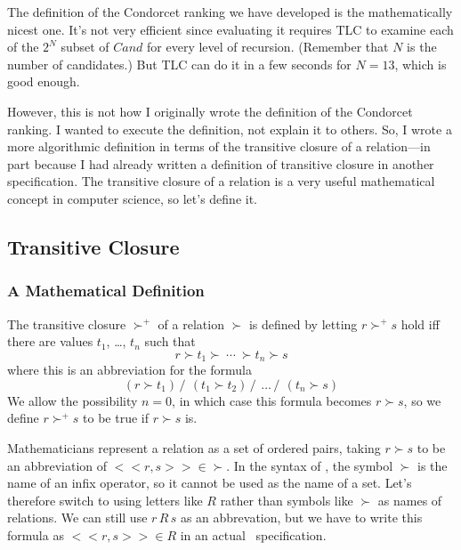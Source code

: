 \documentclass[fleqn,leqno]{article}
\begin{document}
\bigskip

The definition of the Condorcet ranking we have developed is the
mathematically nicest one.  It's not very efficient since evaluating
it requires TLC to examine each of the $2^{N}$ subset of $Cand$ for
every level of recursion.  (Remember that $N$ is the number of
candidates.)  But TLC can do it in a few seconds for $N=13$, which is
good enough.

However, this is not how I originally wrote the definition of the
Condorcet ranking.  I wanted to execute the definition, not explain it
to others.  So, I wrote a more algorithmic definition in terms of the
transitive closure of a relation---in part because I had already
written a definition of transitive closure in another specification.
The transitive closure of a relation is a very useful mathematical
concept in computer science, so let's define it.


\subsection[Transitive Closure]{Transitive 
Closure} 

\subsubsection{A Mathematical Definition}

The transitive closure $\succ^{\!+}$ of a relation $\succ$ is defined by
letting $r \succ^{\!+}\! s$ hold iff there are values $t_{1}$, \ldots,
$t_{n}$ such that
 \[ r \succ t_{1} \succ \ \cdots \ \succ t_{n} \succ s
 \]
where this is an abbreviation for the formula
 \[ (r \succ t_{1}) \, /\ \, (t_{1} \succ t_{2}) \, /\ \, \ldots \, /\ \, (t_{n} \succ s)
 \]
We allow the possibility $n=0$, in which case this formula becomes
$r \succ s$, so we define $r \succ^{\!+}\!s$ to be true if
$r \succ s$ is.  

Mathematicians represent a 
relation as a set of ordered pairs, taking
$r \succ s$ to be an abbreviation of $<<r, s>> \in \succ$.  In the
syntax of \tlaplus, the symbol $\succ$ is the name of an infix
operator, so it cannot be used as the name of a set.  Let's therefore
switch to using letters like $R$ rather than symbols like $\succ$ as
names of relations.  We can still use $r \,R \,s$ as an abbrevation,
but we have to write this formula as $<<r, s>> \in R$ in an actual
\tlaplus\ specification.
\end{document}
